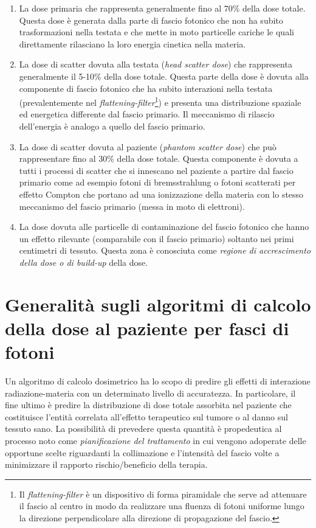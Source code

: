 \begin{enumerate}
\item La dose primaria che rappresenta generalmente fino al 70\% della dose totale. Questa dose è generata dalla parte di fascio fotonico che non ha subito trasformazioni nella testata e che mette in moto particelle cariche le quali direttamente rilasciano la loro energia cinetica nella materia.
\item La dose di scatter dovuta alla testata (\textit{head scatter dose}) che rappresenta generalmente il 5-10\% della dose totale. Questa parte della dose è dovuta alla componente di fascio fotonico che ha subito interazioni nella testata (prevalentemente nel \textit{flattening-filter}\footnote{\label{foot:flatt} Il \textit{flattening-filter} è un dispositivo di forma piramidale che serve ad attenuare il fascio al centro in modo da realizzare una fluenza di fotoni uniforme lungo la direzione perpendicolare alla direzione di propagazione del fascio.}) e presenta una distribuzione spaziale ed energetica differente dal fascio primario. Il meccanismo di rilascio dell'energia è analogo a quello del fascio primario.
\item La dose di scatter dovuta al paziente (\textit{phantom scatter dose}) che può rappresentare fino al 30\% della dose totale. Questa componente è dovuta a tutti i processi di scatter che si innescano nel paziente a partire dal fascio primario come ad esempio fotoni di bremsstrahlung o fotoni scatterati per effetto Compton che portano ad una ionizzazione della materia con lo stesso meccanismo del fascio primario (messa in moto di elettroni).
\item La dose dovuta alle particelle di contaminazione del fascio fotonico che hanno un effetto rilevante (comparabile con il fascio primario) soltanto nei primi centimetri di tessuto. Questa zona è conosciuta come \textit{regione di accrescimento della dose o di build-up} della dose.
\end{enumerate}


\section{Generalità sugli algoritmi di calcolo della dose al paziente per fasci di fotoni}
Un algoritmo di calcolo dosimetrico ha lo scopo di predire gli effetti di interazione radiazione-materia con un determinato livello di accuratezza. In particolare, il fine ultimo è predire la distribuzione di dose totale assorbita nel paziente che costituisce l'entità correlata all'effetto terapeutico sul tumore o al danno sul tessuto sano. La possibilità di prevedere questa quantità è propedeutica al processo noto come \textit{pianificazione del trattamento} in cui vengono adoperate delle opportune scelte riguardanti la collimazione e l'intensità del fascio volte a minimizzare il rapporto rischio/beneficio della terapia.

